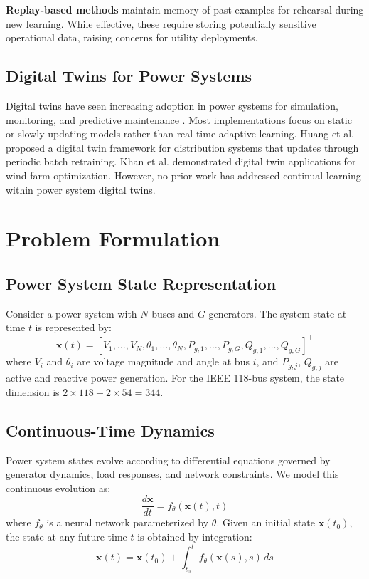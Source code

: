 \documentclass[journal,12pt,onecolumn]{IEEEtran}
\begin{document}
\textbf{Replay-based methods} maintain memory of past examples for rehearsal during new learning. While effective, these require storing potentially sensitive operational data, raising concerns for utility deployments.

\subsection{Digital Twins for Power Systems}

Digital twins have seen increasing adoption in power systems for simulation, monitoring, and predictive maintenance \cite{ref11}. Most implementations focus on static or slowly-updating models rather than real-time adaptive learning. Huang et al. \cite{ref12} proposed a digital twin framework for distribution systems that updates through periodic batch retraining. Khan et al. \cite{ref13} demonstrated digital twin applications for wind farm optimization. However, no prior work has addressed continual learning within power system digital twins.

\section{Problem Formulation}
\label{sec:problem}

\subsection{Power System State Representation}

Consider a power system with $N$ buses and $G$ generators. The system state at time $t$ is represented by:
\begin{equation}
\mathbf{x}(t) = [V_1, \ldots, V_N, \theta_1, \ldots, \theta_N, P_{g,1}, \ldots, P_{g,G}, Q_{g,1}, \ldots, Q_{g,G}]^\top
\label{eq:state}
\end{equation}
where $V_i$ and $\theta_i$ are voltage magnitude and angle at bus $i$, and $P_{g,j}$, $Q_{g,j}$ are active and reactive power generation. For the IEEE 118-bus system, the state dimension is $2 \times 118 + 2 \times 54 = 344$.

\subsection{Continuous-Time Dynamics}

Power system states evolve according to differential equations governed by generator dynamics, load responses, and network constraints. We model this continuous evolution as:
\begin{equation}
\frac{d\mathbf{x}}{dt} = f_\theta(\mathbf{x}(t), t)
\label{eq:dynamics}
\end{equation}
where $f_\theta$ is a neural network parameterized by $\theta$. Given an initial state $\mathbf{x}(t_0)$, the state at any future time $t$ is obtained by integration:
\begin{equation}
\mathbf{x}(t) = \mathbf{x}(t_0) + \int_{t_0}^{t} f_\theta(\mathbf{x}(s), s) \, ds
\label{eq:integral}
\end{equation}
\end{document}
